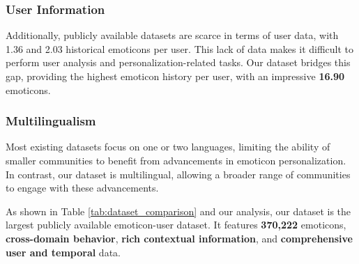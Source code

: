 \subsubsection{User Information}
Additionally, publicly available datasets are scarce in terms of user data, with 1.36 \cite{MOD} and 2.03 \cite{mcdscs} historical emoticons per user. This lack of data makes it difficult to perform user analysis and personalization-related tasks. Our dataset bridges this gap, providing the highest emoticon history per user, with an impressive \textbf{16.90} emoticons.

\subsubsection{Multilingualism}
Most existing datasets focus on one or two languages, limiting the ability of smaller communities to benefit from advancements in emoticon personalization. In contrast, our dataset is multilingual, allowing a broader range of communities to engage with these advancements.

As shown in Table \ref{tab:dataset_comparison} and our analysis, our dataset is the largest publicly available emoticon-user dataset. It features \textbf{370,222} emoticons, \textbf{cross-domain behavior}, \textbf{rich contextual information}, and \textbf{comprehensive user and temporal} data.




